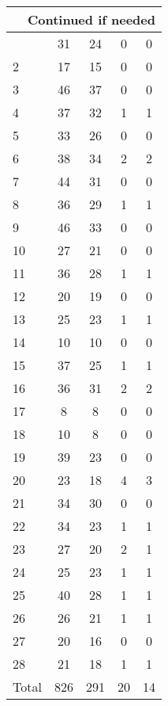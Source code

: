 \begin{center}
\begin{longtable}{l|c|c|c|c}
\hline \multicolumn{5}{|r|}{{Continued if needed}} \\ \hline
\endfoot 
1 & 31 & 24 & 0 & 0\\ \hline
2 & 17 & 15 & 0 & 0\\ \hline
3 & 46 & 37 & 0 & 0\\ \hline
4 & 37 & 32 & 1 & 1\\ \hline
5 & 33 & 26 & 0 & 0\\ \hline
6 & 38 & 34 & 2 & 2\\ \hline
7 & 44 & 31 & 0 & 0\\ \hline
8 & 36 & 29 & 1 & 1\\ \hline
9 & 46 & 33 & 0 & 0\\ \hline
10 & 27 & 21 & 0 & 0\\ \hline
11 & 36 & 28 & 1 & 1\\ \hline
12 & 20 & 19 & 0 & 0\\ \hline
13 & 25 & 23 & 1 & 1\\ \hline
14 & 10 & 10 & 0 & 0\\ \hline
15 & 37 & 25 & 1 & 1\\ \hline
16 & 36 & 31 & 2 & 2\\ \hline
17 & 8 & 8 & 0 & 0\\ \hline
18 & 10 & 8 & 0 & 0\\ \hline
19 & 39 & 23 & 0 & 0\\ \hline
20 & 23 & 18 & 4 & 3\\ \hline
21 & 34 & 30 & 0 & 0\\ \hline
22 & 34 & 23 & 1 & 1\\ \hline
23 & 27 & 20 & 2 & 1\\ \hline
24 & 25 & 23 & 1 & 1\\ \hline
25 & 40 & 28 & 1 & 1\\ \hline
26 & 26 & 21 & 1 & 1\\ \hline
27 & 20 & 16 & 0 & 0\\ \hline
28 & 21 & 18 & 1 & 1\\ \hline
\hline \hline
Total & 826 & 291 & 20 & 14



\end{longtable}
\end{center}

 
